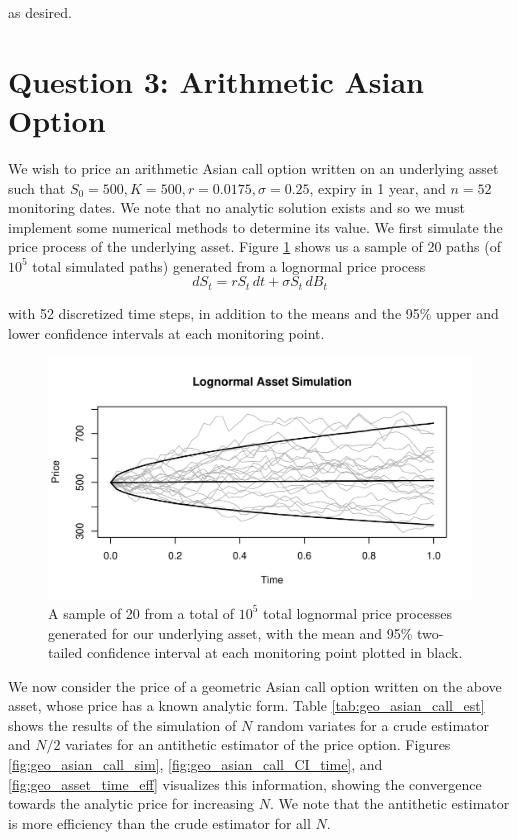 \documentclass[12pt]{article}
\newlength\tindent
\renewcommand{\indent}{\hspace*{\tindent}}
\begin{document}
as desired.


\newpage
\section{Question 3: {\normalfont Arithmetic Asian Option}}

\indent We wish to price an arithmetic Asian call option written on an underlying asset such that $S_0 = 500, K = 500, r = 0.0175, \sigma = 0.25$, expiry in 1 year, and $n = 52$ monitoring dates. We note that no analytic solution exists and so we must implement some numerical methods to determine its value. We first simulate the price process of the underlying asset. Figure \ref{fig:path_sim} shows us a sample of 20 paths (of $10^5$ total simulated paths) generated from a lognormal price process
\begin{equation*}
	dS_t = rS_t\,dt + \sigma S_t \,dB_t
\end{equation*}

with 52 discretized time steps, in addition to the means and the 95\% upper and lower confidence intervals at each monitoring point.

\begin{figure}[H]
	\centering
 	\includegraphics[scale=0.8]{../plots/q3/path_sim.pdf}
\caption{A sample of 20 from a total of $10^5$ total lognormal price processes generated for our underlying asset, with the mean and 95\% two-tailed confidence interval at each monitoring point plotted in black.}
\label{fig:path_sim}
\end{figure}

\indent We now consider the price of a geometric Asian call option written on the above asset, whose price has a known analytic form. Table \ref{tab:geo_asian_call_est} shows the results of the simulation of $N$ random variates for a crude estimator and $N/2$ variates for an antithetic estimator of the price option. Figures \ref{fig:geo_asian_call_sim}, \ref{fig:geo_asian_call_CI_time}, and \ref{fig:geo_asset_time_eff} visualizes this information, showing the convergence towards the analytic price for increasing $N$. We note that the antithetic estimator is more efficiency than the crude estimator for all $N$.
\end{document}
